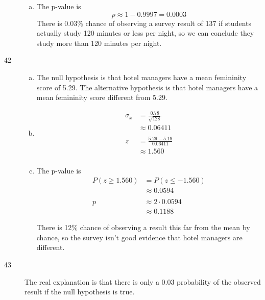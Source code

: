 \documentclass[letterpaper, landscape]{exam}
\begin{document}
\begin{description}
\begin{enumerate}[(a)]
          \item The p-value is 
            \[
              p \approx 1 - 0.9997 = \boxed{ 0.0003 } 
            \]
            There is 0.03\% chance of observing a survey result of 137 if
            students actually study 120 minutes or less per night, so we can
            conclude they study more than 120 minutes per night.

        \end{enumerate}

      \item[42]
        \begin{enumerate}[(a)]
          \item The null hypothesis is that hotel managers have a mean
            femininity score of 5.29. The alternative hypothesis is that hotel
            managers have a mean femininity score different from 5.29.

          \item
            \begin{align*}
              \sigma_{\bar{x}} & = \frac{0.78}{\sqrt{128}} \\
                               & \approx 0.06411 \\
              \\
              z & = \frac{5.29 - 5.19}{0.06411} \\
                & \approx \boxed{ 1.560 } \\
            \end{align*}

          \item The p-value is 
            \begin{align*}
              P(z \geq 1.560) & = P(z \leq -1.560) \\
                              & \approx 0.0594 \\
              \\
              p & \approx 2 \cdot 0.0594 \\
                & \approx \boxed{ 0.1188 }
            \end{align*}

            There is 12\% chance of observing a result this far from the mean by
            chance, so the survey isn't good evidence that hotel managers are
            different.

        \end{enumerate}

      \item[43] The real explanation is that there is only a 0.03 probability of
        the observed result if the null hypothesis is true. 
        

\end{description}
\end{document}
